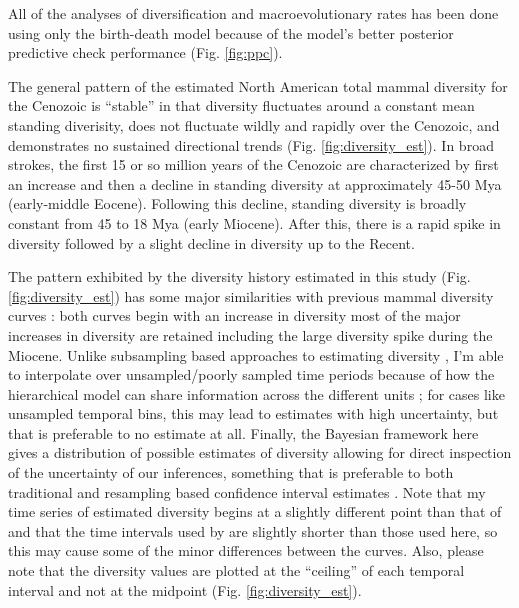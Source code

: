 \documentclass[12pt,letterpaper]{article}
\begin{document}
All of the analyses of diversification and macroevolutionary rates has been done using only the birth-death model because of the model's better posterior predictive check performance (Fig. \ref{fig:ppc}).


The general pattern of the estimated North American total mammal diversity for the Cenozoic is ``stable'' in that diversity fluctuates around a constant mean standing diverisity, does not fluctuate wildly and rapidly over the Cenozoic, and demonstrates no sustained directional trends (Fig. \ref{fig:diversity_est}). In broad strokes, the first 15 or so million years of the Cenozoic are characterized by first an increase and then a decline in standing diversity at approximately 45-50 Mya (early-middle Eocene). Following this decline, standing diversity is broadly constant from 45 to 18 Mya (early Miocene). After this, there is a rapid spike in diversity followed by a slight decline in diversity up to the Recent. 

The pattern exhibited by the diversity history estimated in this study (Fig. \ref{fig:diversity_est}) has some major similarities with previous mammal diversity curves \citep{Alroy2009}: both curves begin with an increase in diversity most of the major increases in diversity are retained including the large diversity spike during the Miocene. Unlike subsampling based approaches to estimating diversity \citep{Alroy2010c}, I'm able to interpolate over unsampled/poorly sampled time periods because of how the hierarchical model can share information across the different units \cite{Gelman2013d}; for cases like unsampled temporal bins, this may lead to estimates with high uncertainty, but that is preferable to no estimate at all. Finally, the Bayesian framework here gives a distribution of possible estimates of diversity allowing for direct inspection of the uncertainty of our inferences, something that is preferable to both traditional and resampling based confidence interval estimates \citep{Gelman2013d}. Note that my time series of estimated diversity begins at a slightly different point than that of \citet{Alroy2009} and that the time intervals used by \citet{Alroy2009} are slightly shorter than those used here, so this may cause some of the minor differences between the curves. Also, please note that the diversity values are plotted at the ``ceiling'' of each temporal interval and not at the midpoint (Fig. \ref{fig:diversity_est}).
\end{document}
